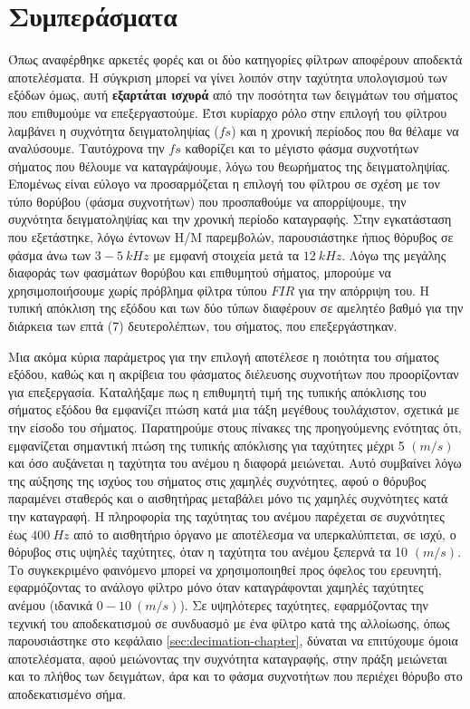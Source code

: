 \documentclass[breaklines=true, 12pt]{article}
\begin{document}
{{{\section{Συμπεράσματα}
\label{sec:orgb0872f9}
Όπως αναφέρθηκε αρκετές φορές και οι δύο κατηγορίες φίλτρων αποφέρουν αποδεκτά
αποτελέσματα. Η σύγκριση μπορεί να γίνει λοιπόν στην ταχύτητα
υπολογισμού των εξόδων όμως, αυτή \textbf{εξαρτάται ισχυρά} από την ποσότητα των
δειγμάτων του σήματος που επιθυμούμε να επεξεργαστούμε. Έτσι κυρίαρχο
ρόλο στην επιλογή του φίλτρου λαμβάνει η συχνότητα δειγματοληψίας (\(fs\)) και η
χρονική περίοδος που θα θέλαμε να αναλύσουμε. Ταυτόχρονα την \(fs\) καθορίζει
και το μέγιστο φάσμα συχνοτήτων σήματος που θέλουμε να καταγράψουμε, λόγω του
θεωρήματος της δειγματοληψίας. Επομένως είναι εύλογο να προσαρμόζεται η
επιλογή του φίλτρου σε σχέση με τον τύπο θορύβου (φάσμα συχνοτήτων)
που προσπαθούμε να απορρίψουμε, την συχνότητα δειγματοληψίας και την χρονική
περίοδο καταγραφής. Στην εγκατάσταση που εξετάστηκε, λόγω έντονων Η/Μ
παρεμβολών, παρουσιάστηκε ήπιος θόρυβος σε φάσμα άνω των \(3-5\ kHz\) με εμφανή
στοιχεία μετά τα \(12\ kHz\). Λόγω της μεγάλης διαφοράς των φασμάτων θορύβου και
επιθυμητού σήματος, μπορούμε να χρησιμοποιήσουμε χωρίς πρόβλημα φίλτρα τύπου
\(FIR\) για την απόρριψη του. Η τυπική απόκλιση της εξόδου και των δύο τύπων
διαφέρουν σε αμελητέο βαθμό για την διάρκεια των επτά (7) δευτερολέπτων, του
σήματος, που επεξεργάστηκαν.

Μια ακόμα κύρια παράμετρος για την επιλογή αποτέλεσε η ποιότητα του σήματος
εξόδου, καθώς και η ακρίβεια του φάσματος διέλευσης συχνοτήτων που
προορίζονταν για επεξεργασία. Καταλήξαμε πως η επιθυμητή τιμή της τυπικής
απόκλισης του σήματος εξόδου θα εμφανίζει πτώση κατά μια τάξη μεγέθους
τουλάχιστον, σχετικά με την είσοδο του σήματος. Παρατηρούμε στους πίνακες της
προηγούμενης ενότητας ότι, εμφανίζεται σημαντική πτώση της τυπικής απόκλισης
για ταχύτητες μέχρι 5 \((m/s)\) και όσο αυξάνεται η ταχύτητα του ανέμου η διαφορά
μειώνεται. Αυτό συμβαίνει λόγω της αύξησης της ισχύος του σήματος στις χαμηλές
συχνότητες, αφού ο θόρυβος παραμένει σταθερός και ο αισθητήρας μεταβάλει μόνο
τις χαμηλές συχνότητες κατά την καταγραφή. Η πληροφορία της
ταχύτητας του ανέμου παρέχεται σε συχνότητες έως \(400\ Hz\) από το αισθητήριο όργανο
με αποτέλεσμα να υπερκαλύπτεται, σε ισχύ, ο θόρυβος στις υψηλές ταχύτητες, όταν η
ταχύτητα του ανέμου ξεπερνά τα 10 \((m/s)\). Το συγκεκριμένο φαινόμενο μπορεί να
χρησιμοποιηθεί προς όφελος του ερευνητή, εφαρμόζοντας το ανάλογο φίλτρο μόνο
όταν καταγράφονται χαμηλές ταχύτητες ανέμου (ιδανικά \(0-10\
(m/s)\)).
Σε υψηλότερες ταχύτητες, εφαρμόζοντας την τεχνική του αποδεκατισμού σε συνδυασμό
με ένα φίλτρο κατά της αλλοίωσης, όπως παρουσιάστηκε στο κεφάλαιο
\ref{sec:decimation-chapter}, δύναται να επιτύχουμε όμοια αποτελέσματα, αφού
μειώνοντας την συχνότητα καταγραφής, στην πράξη μειώνεται και το πλήθος των
δειγμάτων, άρα και το φάσμα συχνοτήτων που περιέχει θόρυβο στο αποδεκατισμένο σήμα.

}}}
\end{document}
